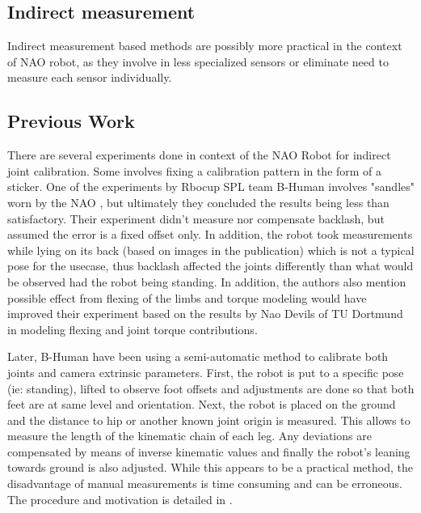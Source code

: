 \documentclass[english, printversion, nomenclature, notitle]{tuvisionthesis} %
\begin{document}
\subsection{Indirect measurement}
Indirect measurement based methods are possibly more practical in the context of NAO robot, as they involve in less specialized sensors or eliminate need to measure each sensor individually.
\subsection{Previous Work}
\label{subsec:joint_calib_previous_work}

There are several experiments done in context of the NAO Robot for indirect joint calibration. Some involves fixing a calibration pattern  in the form of a sticker. One of the experiments by Rbocup SPL team B-Human involves "sandles" worn by the NAO \cite{hutchison_automatic_2015}, but ultimately they concluded the results being less than satisfactory. Their experiment didn't measure nor compensate backlash, but assumed the error is a fixed offset only. In addition, the robot took measurements while lying on its back (based on images in the publication) which is not a typical pose for the usecase, thus backlash affected the joints differently than what would be observed had the robot being standing. In addition, the authors also mention possible effect from flexing of the limbs and torque modeling would have improved their experiment based on the results by Nao Devils of TU Dortmund in modeling flexing and joint torque contributions. 

Later, B-Human have been using a semi-automatic method to calibrate both joints and camera extrinsic parameters. First, the robot is put to a specific pose (ie: standing), lifted to observe foot offsets and adjustments are done so that both feet are at same level and orientation. Next, the robot is placed on the ground and the distance to hip or another known joint origin is measured. This allows to measure the length of the kinematic chain of each leg. Any deviations are compensated by means of inverse kinematic values and finally the robot's leaning towards ground  is also adjusted. While this appears to be a practical method, the disadvantage of manual measurements is time consuming and can be erroneous. The procedure and motivation is detailed in \cite{thomas_rofer_b-human_2018}. 
\end{document}
